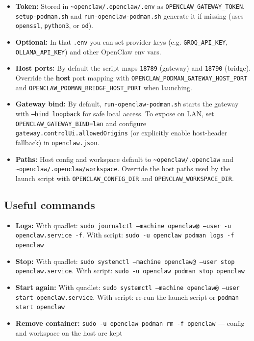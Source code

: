 \begin{itemize}
  \item \textbf{Token:} Stored in \texttt{\textasciitilde{}openclaw/.openclaw/.env} as \texttt{OPENCLAW\_GATEWAY\_TOKEN}. \texttt{setup-podman.sh} and \texttt{run-openclaw-podman.sh} generate it if missing (uses \texttt{openssl}, \texttt{python3}, or \texttt{od}).
  \item \textbf{Optional:} In that \texttt{.env} you can set provider keys (e.g. \texttt{GROQ\_API\_KEY}, \texttt{OLLAMA\_API\_KEY}) and other OpenClaw env vars.
  \item \textbf{Host ports:} By default the script maps \texttt{18789} (gateway) and \texttt{18790} (bridge). Override the \textbf{host} port mapping with \texttt{OPENCLAW\_PODMAN\_GATEWAY\_HOST\_PORT} and \texttt{OPENCLAW\_PODMAN\_BRIDGE\_HOST\_PORT} when launching.
  \item \textbf{Gateway bind:} By default, \texttt{run-openclaw-podman.sh} starts the gateway with \texttt{--bind loopback} for safe local access. To expose on LAN, set \texttt{OPENCLAW\_GATEWAY\_BIND=lan} and configure \texttt{gateway.controlUi.allowedOrigins} (or explicitly enable host-header fallback) in \texttt{openclaw.json}.
  \item \textbf{Paths:} Host config and workspace default to \texttt{\textasciitilde{}openclaw/.openclaw} and \texttt{\textasciitilde{}openclaw/.openclaw/workspace}. Override the host paths used by the launch script with \texttt{OPENCLAW\_CONFIG\_DIR} and \texttt{OPENCLAW\_WORKSPACE\_DIR}.
\end{itemize}


\subsection{Useful commands}


\begin{itemize}
  \item \textbf{Logs:} With quadlet: \texttt{sudo journalctl --machine openclaw@ --user -u openclaw.service -f}. With script: \texttt{sudo -u openclaw podman logs -f openclaw}
  \item \textbf{Stop:} With quadlet: \texttt{sudo systemctl --machine openclaw@ --user stop openclaw.service}. With script: \texttt{sudo -u openclaw podman stop openclaw}
  \item \textbf{Start again:} With quadlet: \texttt{sudo systemctl --machine openclaw@ --user start openclaw.service}. With script: re-run the launch script or \texttt{podman start openclaw}
  \item \textbf{Remove container:} \texttt{sudo -u openclaw podman rm -f openclaw} — config and workspace on the host are kept
\end{itemize}


